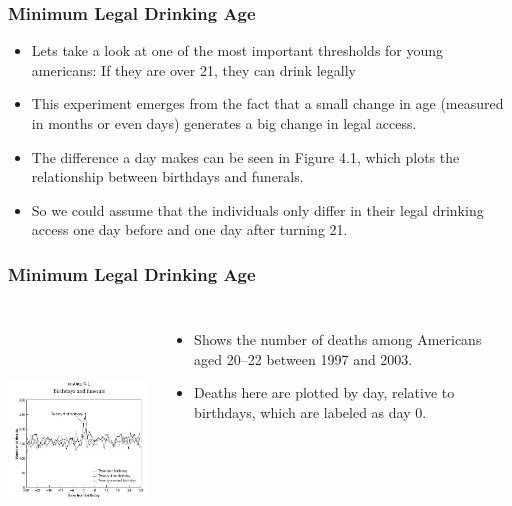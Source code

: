 \documentclass{beamer}
\begin{document}




\begin{frame}
\frametitle{Minimum Legal Drinking Age}
\begin{itemize}
	\item Lets take a look at one of the most important thresholds for young americans: If they are over 21, they can drink legally
	\item This experiment emerges from the fact that a small change in age (measured in months or even days) generates a big change in legal access. 
	\item The difference a day makes can be seen in Figure 4.1, which plots the relationship between birthdays and funerals.
	\item So we could assume that the individuals only differ in their legal drinking access one day before and one day after turning 21.
\end{itemize}

\end{frame}
\begin{frame}
\frametitle{Minimum Legal Drinking Age}
\begin{columns}
\includegraphics[width=6cm,height=6.5cm,keepaspectratio]{Figure 4.1} 

\begin{itemize}
	\item Shows the number of deaths among Americans aged 20–22 between 1997 and 2003. 
	\item Deaths here are plotted by day, relative to birthdays, which are labeled as day 0.
\end{itemize}

\end{columns}
\end{frame}
\end{document}
